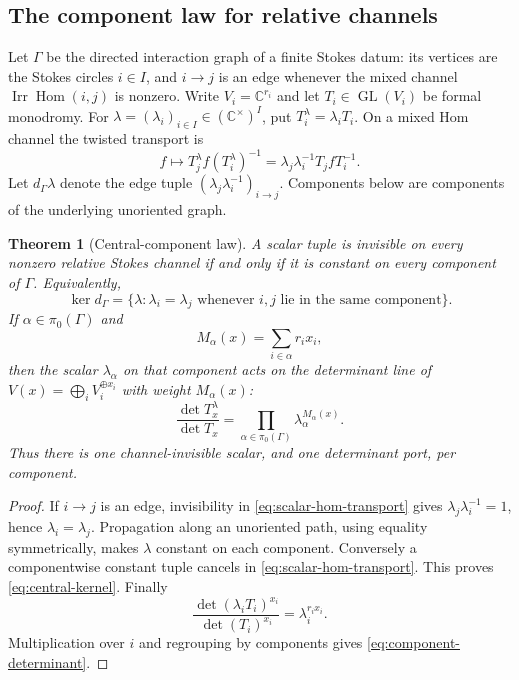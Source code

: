 \documentclass[11pt,a4paper]{amsart}
\theoremstyle{plain}
\newtheorem{theorem}{Theorem}[section]
\theoremstyle{definition}
\newcommand{\CC}{\mathbb C}
\newcommand{\Irr}{\operatorname{Irr}}
\newcommand{\Hom}{\operatorname{Hom}}
\begin{document}
\subsection{The component law for relative channels}

Let $\Gamma$ be the directed interaction graph of a finite Stokes datum: its vertices are the
Stokes circles $i\in I$, and $i\to j$ is an edge whenever the mixed channel
$\Irr\Hom(i,j)$ is nonzero.  Write $V_i=\CC^{r_i}$ and let
$T_i\in\operatorname{GL}(V_i)$ be formal monodromy.
For $\lambda=(\lambda_i)_{i\in I}\in(\CC^\times)^I$, put
$T_i^\lambda=\lambda_iT_i$.  On a mixed Hom channel the twisted transport is
\begin{equation}\label{eq:scalar-hom-transport}
 f\longmapsto T_j^\lambda f(T_i^\lambda)^{-1}
   =\lambda_j\lambda_i^{-1}T_jfT_i^{-1}.
\end{equation}
Let $d_\Gamma\lambda$ denote the edge tuple
$(\lambda_j\lambda_i^{-1})_{i\to j}$.  Components below are components of the underlying
unoriented graph.

\begin{theorem}[Central-component law]\label{thm:central-components}
A scalar tuple is invisible on every nonzero relative Stokes channel if and only if it is constant
on every component of $\Gamma$.  Equivalently,
\begin{equation}\label{eq:central-kernel}
 \ker d_\Gamma=\{\lambda:\lambda_i=\lambda_j
       \text{ whenever }i,j\text{ lie in the same component}\}.
\end{equation}
If $\alpha\in\pi_0(\Gamma)$ and
\[
 M_\alpha(x)=\sum_{i\in\alpha}r_ix_i,
\]
then the scalar $\lambda_\alpha$ on that component acts on the determinant line of
$V(x)=\bigoplus_iV_i^{\oplus x_i}$ with weight $M_\alpha(x)$:
\begin{equation}\label{eq:component-determinant}
 \frac{\det T_x^\lambda}{\det T_x}
       =\prod_{\alpha\in\pi_0(\Gamma)}
          \lambda_\alpha^{M_\alpha(x)}.
\end{equation}
Thus there is one channel-invisible scalar, and one determinant port, per component.
\end{theorem}

\begin{proof}
If $i\to j$ is an edge, invisibility in \eqref{eq:scalar-hom-transport} gives
$\lambda_j\lambda_i^{-1}=1$, hence $\lambda_i=\lambda_j$.  Propagation along an unoriented path,
using equality symmetrically, makes $\lambda$ constant on each component.  Conversely a
componentwise constant tuple cancels in \eqref{eq:scalar-hom-transport}.  This proves
\eqref{eq:central-kernel}.  Finally
\[
 \frac{\det(\lambda_iT_i)^{x_i}}{\det(T_i)^{x_i}}
       =\lambda_i^{r_ix_i}.
\]
Multiplication over $i$ and regrouping by components gives
\eqref{eq:component-determinant}.
\end{proof}
\end{document}
